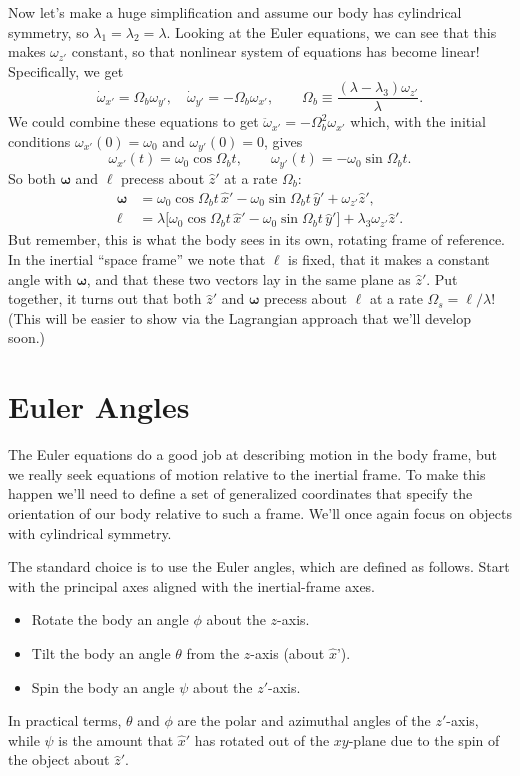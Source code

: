 \documentclass[../p111main.tex]{subfiles}
\begin{document}
Now let's make a huge simplification and assume our body has cylindrical symmetry, so $\lambda_1 = \lambda_2 = \lambda$.
Looking at the Euler equations, we can see that this makes $\omega_{z'}$ constant, so that nonlinear system of equations has become linear!
Specifically, we get
\[ \dot \omega_{x'} = \Omega_b \omega_{y'}, \quad \dot \omega_{y'} = -\Omega_b \omega_{x'}, \qquad \Omega_b \equiv \frac{(\lambda - \lambda_3) \omega_{z'}}{\lambda}. \]
We could combine these equations to get $\ddot \omega_{x'} = -\Omega_b^2 \omega_{x'}$ which, with the initial conditions $\omega_{x'}(0) = \omega_0$ and $\omega_{y'}(0) = 0$, gives
\[ \omega_{x'}(t) = \omega_0 \cos \Omega_b t, \qquad \omega_{y'}(t) = -\omega_0 \sin \Omega_b t. \]
So both $\bm \omega$ and $\bm \ell$ precess about $\hat z'$ at a rate $\Omega_b$:
\begin{align*}
    \bm \omega &= \omega_0 \cos \Omega_b t \, \hat x' - \omega_0 \sin \Omega_b t \, \hat y' + \omega_{z'} \hat z', \\
    \bm \ell &= \lambda \big[ \omega_0 \cos \Omega_b t \, \hat x' - \omega_0 \sin \Omega_b t \, \hat y' \big] + \lambda_3 \omega_{z'} \hat z'.
\end{align*}
But remember, this is what the body sees in its own, rotating frame of reference.
In the inertial ``space frame'' we note that $\bm \ell$ is fixed, that it makes a constant angle with $\bm \omega$, and that these two vectors lay in the same plane as $\hat z'$.
Put together, it turns out that both $\hat z'$ and $\bm \omega$ precess about $\bm \ell$ at a rate $\Omega_s = \ell / \lambda$!
(This will be easier to show via the Lagrangian approach that we'll develop soon.)

\section{Euler Angles}
The Euler equations do a good job at describing motion in the body frame, but we really seek equations of motion relative to the inertial frame.
To make this happen we'll need to define a set of generalized coordinates that specify the orientation of our body relative to such a frame.
We'll once again focus on objects with cylindrical symmetry.

The standard choice is to use the Euler angles, which are defined as follows.
Start with the principal axes aligned with the inertial-frame axes.
\begin{itemize}[topsep=0pt]
    \item Rotate the body an angle $\phi$ about the $z$-axis.
    \item Tilt the body an angle $\theta$ from the $z$-axis (about $\hat x$').
    \item Spin the body an angle $\psi$ about the $z'$-axis.
\end{itemize}
In practical terms, $\theta$ and $\phi$ are the polar and azimuthal angles of the $z'$-axis, while $\psi$ is the amount that $\hat x'$ has rotated out of the $xy$-plane due to the spin of the object about $\hat z'$.
\end{document}

